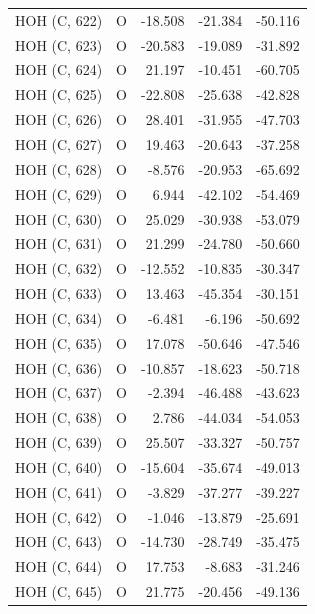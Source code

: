 \begin{longtable}{@{}lcrr@{}}
  \cmidrule(r){1-5}
  HOH (C, 622) & O & -18.508 & -21.384 & -50.116 \\
  \cmidrule(r){1-5}
  HOH (C, 623) & O & -20.583 & -19.089 & -31.892 \\
  \cmidrule(r){1-5}
  HOH (C, 624) & O & 21.197 & -10.451 & -60.705 \\
  \cmidrule(r){1-5}
  HOH (C, 625) & O & -22.808 & -25.638 & -42.828 \\
  \cmidrule(r){1-5}
  HOH (C, 626) & O & 28.401 & -31.955 & -47.703 \\
  \cmidrule(r){1-5}
  HOH (C, 627) & O & 19.463 & -20.643 & -37.258 \\
  \cmidrule(r){1-5}
  HOH (C, 628) & O & -8.576 & -20.953 & -65.692 \\
  \cmidrule(r){1-5}
  HOH (C, 629) & O & 6.944 & -42.102 & -54.469 \\
  \cmidrule(r){1-5}
  HOH (C, 630) & O & 25.029 & -30.938 & -53.079 \\
  \cmidrule(r){1-5}
  HOH (C, 631) & O & 21.299 & -24.780 & -50.660 \\
  \cmidrule(r){1-5}
  HOH (C, 632) & O & -12.552 & -10.835 & -30.347 \\
  \cmidrule(r){1-5}
  HOH (C, 633) & O & 13.463 & -45.354 & -30.151 \\
  \cmidrule(r){1-5}
  HOH (C, 634) & O & -6.481 & -6.196 & -50.692 \\
  \cmidrule(r){1-5}
  HOH (C, 635) & O & 17.078 & -50.646 & -47.546 \\
  \cmidrule(r){1-5}
  HOH (C, 636) & O & -10.857 & -18.623 & -50.718 \\
  \cmidrule(r){1-5}
  HOH (C, 637) & O & -2.394 & -46.488 & -43.623 \\
  \cmidrule(r){1-5}
  HOH (C, 638) & O & 2.786 & -44.034 & -54.053 \\
  \cmidrule(r){1-5}
  HOH (C, 639) & O & 25.507 & -33.327 & -50.757 \\
  \cmidrule(r){1-5}
  HOH (C, 640) & O & -15.604 & -35.674 & -49.013 \\
  \cmidrule(r){1-5}
  HOH (C, 641) & O & -3.829 & -37.277 & -39.227 \\
  \cmidrule(r){1-5}
  HOH (C, 642) & O & -1.046 & -13.879 & -25.691 \\
  \cmidrule(r){1-5}
  HOH (C, 643) & O & -14.730 & -28.749 & -35.475 \\
  \cmidrule(r){1-5}
  HOH (C, 644) & O & 17.753 & -8.683 & -31.246 \\
  \cmidrule(r){1-5}
  HOH (C, 645) & O & 21.775 & -20.456 & -49.136 \\

\end{longtable}
